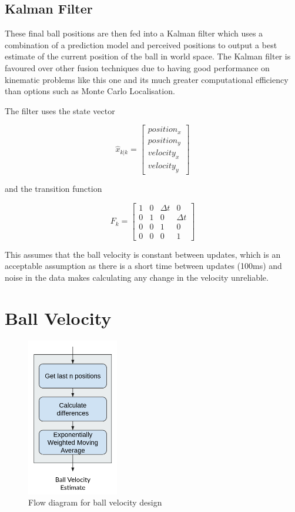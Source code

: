  \subsection{Kalman Filter}
 
These final ball positions are then fed into a Kalman filter which uses a combination of a prediction model and perceived positions to output a best estimate of the current position of the ball in world space. The Kalman filter is favoured over other fusion techniques due to having good performance on kinematic problems like this one and its much greater computational efficiency than options such as Monte Carlo Localisation. 

The filter uses the state vector

\[\hat{x}_{k|k} = \begin{bmatrix}position_x \\ position_y \\ velocity_x \\ velocity_y\end{bmatrix}\]

\noindent and the transition function

\[F_k = \begin{bmatrix} 1 & 0 & \Delta t & 0 \\ 0 & 1 & 0 & \Delta t \\ 0 & 0 & 1 & 0 \\ 0 & 0 & 0 & 1\end{bmatrix}\]

This assumes that the ball velocity is constant between updates, which is an acceptable assumption as there is a short time between updates (100ms) and noise in the data makes calculating any change in the velocity unreliable. 


\section{Ball Velocity}

\begin{figure}[H]
    \centering
    \includegraphics[width=4cm]{images/velocity-design.png}
    \caption{Flow diagram for ball velocity design}
    \label{fig:velocity design}
\end{figure}

